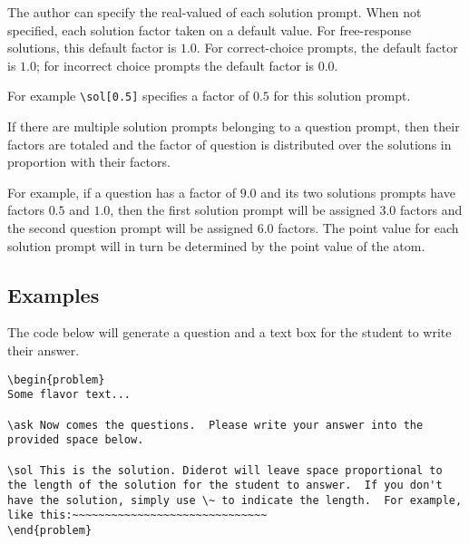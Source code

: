 \begin{gram}
The author can specify the real-valued  of each solution prompt.  
%
When not specified, each solution factor taken on a default value.
%
For free-response solutions, this default factor is $1.0$.
%
For correct-choice prompts, the default factor is $1.0$; for incorrect
choice prompts the default factor is $0.0$.

For example \lstinline`\sol[0.5]` specifies a factor of $0.5$ for this
solution prompt. 

If there are multiple solution prompts belonging to a question prompt,
then their factors are totaled and the factor of question is distributed
over the solutions in proportion with their factors.  

For example, if a question has a factor of $9.0$ and its two solutions
prompts have factors $0.5$ and $1.0$, then the first solution prompt
will be assigned $3.0$ factors and the second question prompt will be
assigned $6.0$ factors.  The point value for each solution prompt will
in turn be determined by the point value of the atom.


\end{gram}


\subsection{Examples}

\begin{example}
The code below will generate a question and a text box for the student
to write their answer.

\begin{lstlisting}
\begin{problem}
Some flavor text...

\ask Now comes the questions.  Please write your answer into the
provided space below.

\sol This is the solution. Diderot will leave space proportional to
the length of the solution for the student to answer.  If you don't
have the solution, simply use \~ to indicate the length.  For example,
like this:~~~~~~~~~~~~~~~~~~~~~~~~~~~~~~
\end{problem}
\end{lstlisting}

\end{example}

